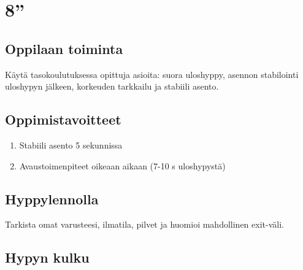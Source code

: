 \section{ 8'' }
\label{nova-peruskoulutuksen-suoritukset-8}

\subsection{ Oppilaan toiminta }
\label{nova-peruskoulutuksen-suoritukset-oppilaan-toiminta}


Käytä tasokoulutuksessa opittuja asioita: suora uloshyppy, asennon stabilointi uloshypyn jälkeen, korkeuden tarkkailu ja stabiili asento. 

\subsection{ Oppimistavoitteet }
\label{nova-peruskoulutuksen-suoritukset-oppimistavoitteet}

\begin{enumerate}[label=\bfseries \arabic*)]
\item  Stabiili asento 5 sekunnissa 
\item  Avaustoimenpiteet oikeaan aikaan (7-10 s uloshypystä) 
\end{enumerate}
\subsection{ Hyppylennolla }
\label{nova-peruskoulutuksen-suoritukset-hyppylennolla}


Tarkista omat varusteesi, ilmatila, pilvet ja huomioi mahdollinen exit-väli. 

\subsection{ Hypyn kulku }
\label{nova-peruskoulutuksen-suoritukset-hypyn-kulku}

